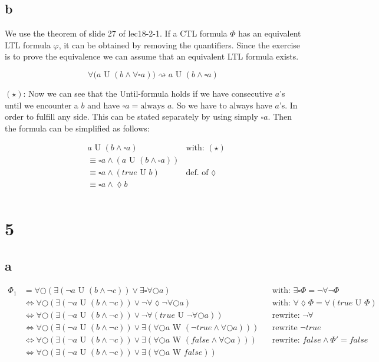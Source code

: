\documentclass[11pt]{article}
\newcommand{\U}{\text{ U }}
\newcommand{\W}{\text{ W }}
\begin{document}
\subsection{b}
We use the theorem of slide 27 of lec18-2-1. If a CTL formula $\Phi$ has an equivalent LTL formula $\varphi$, it can be obtained by removing the quantifiers. Since the exercise is to prove the equivalence we can assume that an equivalent LTL formula exists.

$$\forall \big( a \U (b \land \forall\square a)\big) \rightsquigarrow a \U (b \land \square a)$$

$(\star)$: Now we can see that the Until-formula holds if we have consecutive $a$'s until we encounter a $b$ and have $\square a = \text{always }a$. So we have to always have $a$'s. In order to fulfill any side. This can be stated separately by using simply $\square a$. Then the formula can be simplified as follows:

\begin{align*}
&a \U (b \land \square a) & \text{with: }(\star) \\
&\equiv \square a \land (a \U (b \land \square a)) & \\
&\equiv \square a \land (true \U b) & \text{def. of }\lozenge\\
&\equiv \square a \land \lozenge b \\
\end{align*}

\section{5}
\subsection{a}
\begin{align*}
	\Phi_1 &= \forall \bigcirc ( \exists ( \lnot a \U (b \land \lnot c)) \lor \exists \square \forall \bigcirc a) & & \text{with: } \exists\square \Phi = \lnot \forall\lnot \Phi \\
	&\Leftrightarrow \forall \bigcirc ( \exists ( \lnot a \U (b \land \lnot c)) \lor \lnot \forall \lozenge \lnot \forall \bigcirc a) & & \text{with: } \forall\lozenge\Phi = \forall(true \U \Phi)\\
	&\Leftrightarrow \forall \bigcirc ( \exists ( \lnot a \U (b \land \lnot c)) \lor \lnot \forall (true \U \lnot \forall \bigcirc a)) & & \text{rewrite: } \lnot\forall\\
	&\Leftrightarrow \forall \bigcirc ( \exists ( \lnot a \U (b \land \lnot c)) \lor \exists(\forall \bigcirc a \W (\lnot true \land \forall \bigcirc a))) & & \text{rewrite } \lnot true\\
	&\Leftrightarrow \forall \bigcirc ( \exists ( \lnot a \U (b \land \lnot c)) \lor \exists(\forall \bigcirc a \W (false \land \forall \bigcirc a))) & & \text{rewrite: } false \land \Phi' = false\\
	&\Leftrightarrow \forall \bigcirc ( \exists ( \lnot a \U (b \land \lnot c)) \lor \exists(\forall \bigcirc a \W false)) \\
\end{align*}
\end{document}
